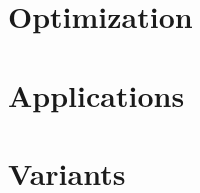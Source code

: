 \documentclass[a4paper]{twentysecondcv} %
\begin{document}

\section{Optimization}

\begin{twentyshort} %

\end{twentyshort}



\section{Applications}

\begin{twentyshort} %

\end{twentyshort}



\section{Variants}

\begin{twenty} %

\end{twenty}


\end{document}
